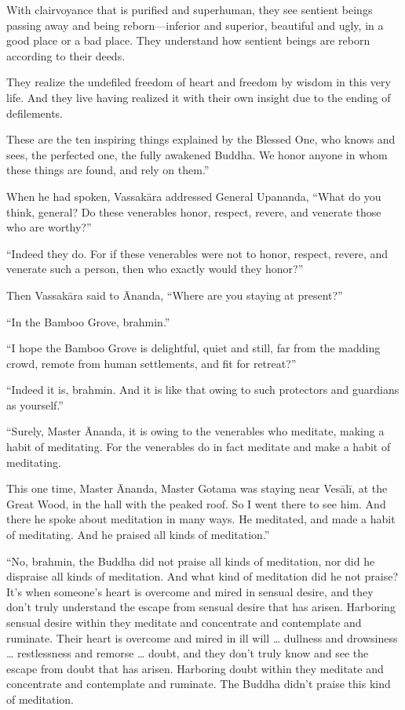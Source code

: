 \documentclass[12pt,openany]{book}%
\begin{document}
With clairvoyance that is purified and superhuman, they see sentient beings passing away and being reborn—inferior and superior, beautiful and ugly, in a good place or a bad place. They understand how sentient beings are reborn according to their deeds. 

They realize the undefiled freedom of heart and freedom by wisdom in this very life. And they live having realized it with their own insight due to the ending of defilements. 

These are the ten inspiring things explained by the Blessed One, who knows and sees, the perfected one, the fully awakened Buddha. We honor anyone in whom these things are found, and rely on them.” 

When he had spoken, \textsanskrit{Vassakāra} addressed General Upananda, “What do you think, general? Do these venerables honor, respect, revere, and venerate those who are worthy?” 

“Indeed they do. For if these venerables were not to honor, respect, revere, and venerate such a person, then who exactly would they honor?” 

Then \textsanskrit{Vassakāra} said to Ānanda, “Where are you staying at present?” 

“In the Bamboo Grove, brahmin.” 

“I hope the Bamboo Grove is delightful, quiet and still, far from the madding crowd, remote from human settlements, and fit for retreat?” 

“Indeed it is, brahmin. And it is like that owing to such protectors and guardians as yourself.” 

“Surely, Master Ānanda, it is owing to the venerables who meditate, making a habit of meditating. For the venerables do in fact meditate and make a habit of meditating. 

This one time, Master Ānanda, Master Gotama was staying near \textsanskrit{Vesālī}, at the Great Wood, in the hall with the peaked roof. So I went there to see him. And there he spoke about meditation in many ways. He meditated, and made a habit of meditating. And he praised all kinds of meditation.” 

“No, brahmin, the Buddha did not praise all kinds of meditation, nor did he dispraise all kinds of meditation. And what kind of meditation did he not praise? It’s when someone’s heart is overcome and mired in sensual desire, and they don’t truly understand the escape from sensual desire that has arisen. Harboring sensual desire within they meditate and concentrate and contemplate and ruminate. Their heart is overcome and mired in ill will … dullness and drowsiness … restlessness and remorse … doubt, and they don’t truly know and see the escape from doubt that has arisen. Harboring doubt within they meditate and concentrate and contemplate and ruminate. The Buddha didn’t praise this kind of meditation. 
\end{document}
